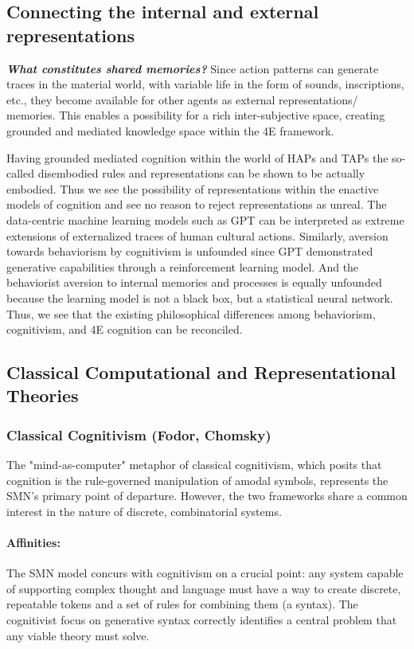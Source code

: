 \subsection{Connecting the internal and external representations} \textbf{\textit{What constitutes shared memories?}} Since action patterns can generate traces in the material world, with variable life in the form of sounds, inscriptions, etc., they become available for other agents as external representations/ memories. This enables a possibility for a rich inter-subjective space, creating grounded and mediated knowledge space within the 4E framework.

Having grounded mediated cognition within the world of HAPs and TAPs the so-called disembodied rules and representations can be shown to be actually embodied. Thus we see the possibility of representations within the enactive models of cognition and see no reason to reject representations as unreal. The data-centric machine learning models such as GPT can be interpreted as extreme extensions of externalized traces of human cultural actions. Similarly, aversion towards behaviorism by cognitivism is unfounded since GPT demonstrated generative capabilities through a reinforcement learning model. And the behaviorist aversion to internal memories and processes is equally unfounded because the learning model is not a black box, but a statistical neural network. Thus, we see that the existing philosophical differences among behaviorism, cognitivism, and 4E cognition can be reconciled.

\subsection{Classical Computational and Representational Theories}
\label{subsec:comparison_classical}

\subsubsection{Classical Cognitivism (Fodor, Chomsky)}
\label{ssubsec:cognitivism}
The "mind-as-computer" metaphor of classical cognitivism, which posits that cognition is the rule-governed manipulation of amodal symbols, represents the SMN's primary point of departure. However, the two frameworks share a common interest in the nature of discrete, combinatorial systems.

\paragraph{Affinities:} The SMN model concurs with cognitivism on a crucial point: any system capable of supporting complex thought and language must have a way to create discrete, repeatable tokens and a set of rules for combining them (a syntax). The cognitivist focus on generative syntax correctly identifies a central problem that any viable theory must solve.

